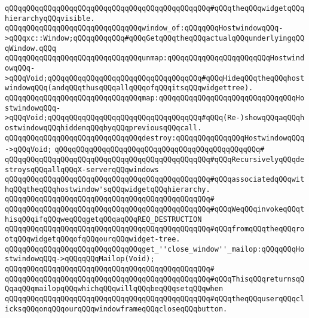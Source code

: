 \verb|qQQqqQQqqQQqqQQqqQQqqQQqqQQqqQQqqQQqqQQqqQQqqQQq#qQQqtheqQQqwidgetqQQqhierarchyqQQqvisible.|\newline
\newline
\verb|qQQqqQQqqQQqqQQqqQQqqQQqqQQqqQQqwindow_of:qQQqqQQqHostwindowqQQq->qQQqxc::Window;qQQqqQQqqQQq#qQQqGetqQQqtheqQQqactualqQQqunderlyingqQQqWindow.qQQq|\newline
\verb|qQQqqQQqqQQqqQQqqQQqqQQqqQQqqQQqunmap:qQQqqQQqqQQqqQQqqQQqqQQqHostwindowqQQq->qQQqVoid;qQQqqQQqqQQqqQQqqQQqqQQqqQQqqQQqqQQq#qQQqHideqQQqtheqQQqhostwindowqQQq(andqQQqthusqQQqallqQQqofqQQqitsqQQqwidgettree).|\newline
\verb|qQQqqQQqqQQqqQQqqQQqqQQqqQQqqQQqmap:qQQqqQQqqQQqqQQqqQQqqQQqqQQqqQQqHostwindowqQQq->qQQqVoid;qQQqqQQqqQQqqQQqqQQqqQQqqQQqqQQqqQQq#qQQq(Re-)showqQQqaqQQqhostwindowqQQqhiddenqQQqbyqQQqpreviousqQQqcall.|\newline
\newline
\verb|qQQqqQQqqQQqqQQqqQQqqQQqqQQqqQQqdestroy:qQQqqQQqqQQqqQQqHostwindowqQQq->qQQqVoid;|\newline
\verb|qQQqqQQqqQQqqQQqqQQqqQQqqQQqqQQqqQQqqQQqqQQqqQQq#|\newline
\verb|qQQqqQQqqQQqqQQqqQQqqQQqqQQqqQQqqQQqqQQqqQQqqQQq#qQQqRecursivelyqQQqdestroysqQQqallqQQqX-serverqQQqwindows|\newline
\verb|qQQqqQQqqQQqqQQqqQQqqQQqqQQqqQQqqQQqqQQqqQQqqQQq#qQQqassociatedqQQqwithqQQqtheqQQqhostwindow'sqQQqwidgetqQQqhierarchy.|\newline
\verb|qQQqqQQqqQQqqQQqqQQqqQQqqQQqqQQqqQQqqQQqqQQqqQQq#|\newline
\verb|qQQqqQQqqQQqqQQqqQQqqQQqqQQqqQQqqQQqqQQqqQQqqQQq#qQQqWeqQQqinvokeqQQqthisqQQqifqQQqweqQQqgetqQQqaqQQqREQ_DESTRUCTION|\newline
\verb|qQQqqQQqqQQqqQQqqQQqqQQqqQQqqQQqqQQqqQQqqQQqqQQq#qQQqfromqQQqtheqQQqrootqQQqwidgetqQQqofqQQqourqQQqwidget-tree.|\newline
\newline
\verb|qQQqqQQqqQQqqQQqqQQqqQQqqQQqqQQqget_''close_window''_mailop:qQQqqQQqHostwindowqQQq->qQQqqQQqMailop(Void);|\newline
\verb|qQQqqQQqqQQqqQQqqQQqqQQqqQQqqQQqqQQqqQQqqQQqqQQq#|\newline
\verb|qQQqqQQqqQQqqQQqqQQqqQQqqQQqqQQqqQQqqQQqqQQqqQQq#qQQqThisqQQqreturnsqQQqaqQQqmailopqQQqwhichqQQqwillqQQqbeqQQqsetqQQqwhen|\newline
\verb|qQQqqQQqqQQqqQQqqQQqqQQqqQQqqQQqqQQqqQQqqQQqqQQq#qQQqtheqQQquserqQQqclicksqQQqonqQQqourqQQqwindowframeqQQqcloseqQQqbutton.|\newline
